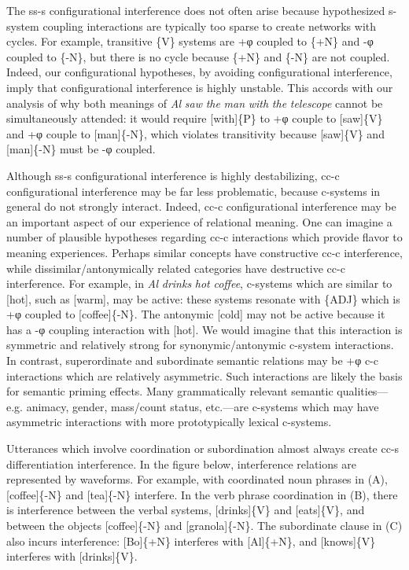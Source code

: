   The ss-s configurational interference does not often arise because hypothesized s-system coupling interactions are typically too sparse to create networks with cycles. For example, transitive \{V\} systems are +φ coupled to \{+N\} and -φ coupled to \{-N\}, but there is no cycle because \{+N\} and \{-N\} are not coupled. Indeed, our configurational hypotheses, by avoiding configurational interference, imply that configurational interference is highly unstable. This accords with our analysis of why both meanings of \textit{Al} \textit{saw} \textit{the} \textit{man} \textit{with} \textit{the} \textit{telescope} cannot be simultaneously attended: it would require [with]\{P\} to +φ couple to [saw]\{V\} and +φ couple to [man]\{-N\}, which violates transitivity because [saw]\{V\} and [man]\{-N\} must be -φ coupled. 

  Although ss-s configurational interference is highly destabilizing, cc-c configurational interference may be far less problematic, because c-systems in general do not strongly interact. Indeed, cc-c configurational interference may be an important aspect of our experience of relational meaning. One can imagine a number of plausible hypotheses regarding cc-c interactions which provide flavor to meaning experiences. Perhaps similar concepts have constructive cc-c interference, while dissimilar/antonymically related categories have destructive cc-c interference. For example, in \textit{Al} \textit{drinks} \textit{hot} \textit{coffee}, c-systems which are similar to [hot], such as [warm], may be active: these systems resonate with \{\textsc{ADJ}\} which is +φ coupled to [coffee]\{-N\}. The antonymic [cold] may not be active because it has a -φ coupling interaction with [hot]. We would imagine that this interaction is symmetric and relatively strong for synonymic/antonymic c-system interactions. In contrast, superordinate and subordinate semantic relations may be +φ c-c interactions which are relatively asymmetric. Such interactions are likely the basis for semantic priming effects. Many grammatically relevant semantic qualities—e.g. animacy, gender, mass/count status, etc.—are c-systems which may have asymmetric interactions with more prototypically lexical c-systems.

  Utterances which involve coordination or subordination almost always create cc-s differentiation interference. In the figure below, interference relations are represented by waveforms. For example, with coordinated noun phrases in (A), [coffee]\{-N\} and [tea]\{-N\} interfere. In the verb phrase coordination in (B), there is interference between the verbal systems, [drinks]\{V\} and [eats]\{V\}, and between the objects [coffee]\{-N\} and [granola]\{-N\}. The subordinate clause in (C) also incurs interference: [Bo]\{+N\} interferes with [Al]\{+N\}, and [knows]\{V\} interferes with [drinks]\{V\}.

